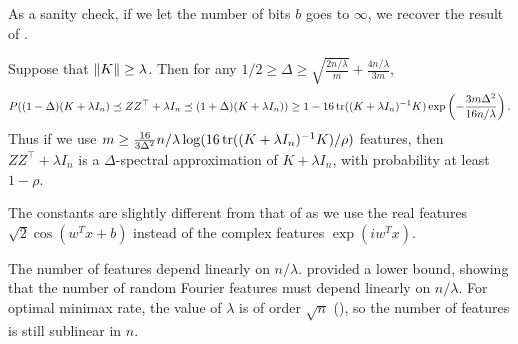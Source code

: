 As a sanity check, if we let the number of bits $b$ goes to $\infty$, we recover the
result of \citet{avron17}.
\begin{corollary}
  Suppose that $\|K\| \geq \lambda$.
  Then for any $1/2 \geq \Delta \geq \sqrt{\frac{2n/\lambda}{m}} + \frac{4n/\lambda}{3m}$,
  \begin{equation*}
    P((1 - \Delta)(K + \lambda I_n) \preceq Z Z^\top + \lambda I_n \preceq (1 + \Delta)(K + \lambda I_n)) \geq 1 - 16 \mathop{\rm tr}((K +
    \lambda I_n)^{-1} K) \exp \left( -\frac{3m \Delta^2}{16n/\lambda} \right).
  \end{equation*}
  Thus if we use $m \geq \frac{16}{3 \Delta^2} n/\lambda \log (16 \mathop{\rm tr}((K + \lambda I_n)^{-1} K) / \rho)$
  features, then $Z Z^\top + \lambda I_n$ is a $\Delta$-spectral approximation of $K + \lambda I_n$,
  with probability at least $1 - \rho$.
\end{corollary}
The constants are slightly different from that of \citet{avron17} as we use the
real features $\sqrt{2} \cos(w^T x + b)$ instead of the complex features $\exp(i
w^T x)$.

The number of features depend linearly on $n/ \lambda$.
\citet{avron17} provided a lower bound, showing that the number of random Fourier features
must depend linearly on $n / \lambda$.
For optimal minimax rate, the value of $\lambda$ is of order $\sqrt{n}$ (), so the number of features is still sublinear in $n$.

